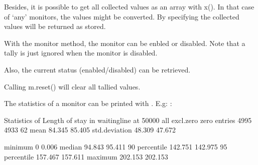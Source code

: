\documentclass[letterpaper,10pt,english]{sphinxmanual}
\begin{document}
Besides, it is possible to get all collected values as an array with x(). In that case of ‘any’ monitors,
the values might be converted. By specifying  the collected values will be returned as stored.

With the monitor method, the monitor can be enbled or disabled. Note that a tally is just ignored when
the monitor is disabled.

Also, the current status (enabled/disabled) can be retrieved.

\begin{sphinxVerbatim}[commandchars=\\\{\}]
  
  
 
\end{sphinxVerbatim}

Calling m.reset() will clear all tallied values.

The statistics of a monitor can be printed with .
E.g: :

\begin{sphinxVerbatim}[commandchars=\\\{\}]
Statistics of Length of stay in waitingline at     50000
                        all    excl.zero         zero
\PYGZhy{}\PYGZhy{}\PYGZhy{}\PYGZhy{}\PYGZhy{}\PYGZhy{}\PYGZhy{}\PYGZhy{}\PYGZhy{}\PYGZhy{}\PYGZhy{}\PYGZhy{}\PYGZhy{}\PYGZhy{} \PYGZhy{}\PYGZhy{}\PYGZhy{}\PYGZhy{}\PYGZhy{}\PYGZhy{}\PYGZhy{}\PYGZhy{}\PYGZhy{}\PYGZhy{}\PYGZhy{}\PYGZhy{} \PYGZhy{}\PYGZhy{}\PYGZhy{}\PYGZhy{}\PYGZhy{}\PYGZhy{}\PYGZhy{}\PYGZhy{}\PYGZhy{}\PYGZhy{}\PYGZhy{}\PYGZhy{} \PYGZhy{}\PYGZhy{}\PYGZhy{}\PYGZhy{}\PYGZhy{}\PYGZhy{}\PYGZhy{}\PYGZhy{}\PYGZhy{}\PYGZhy{}\PYGZhy{}\PYGZhy{}
entries            4995         4933           62
mean                 84.345       85.405
std.deviation        48.309       47.672

minimum               0            0.006
median               94.843       95.411
90\PYGZpc{} percentile      142.751      142.975
95\PYGZpc{} percentile      157.467      157.611
maximum             202.153      202.153
\end{sphinxVerbatim}
\end{document}
